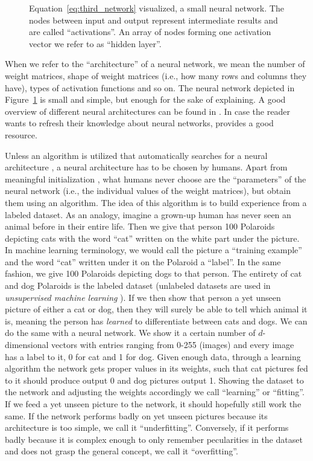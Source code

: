 \begin{figure}[!htb]
    \centering
    
    \caption{Equation~\ref{eq:third_network} visualized, a small neural network. The nodes between input and output represent intermediate results and are called \enquote{activations}. An array of nodes forming one activation vector we refer to as \enquote{hidden layer}.}
\label{fig:third_network}
\end{figure}
\FloatBarrier

\noindent When we refer to the \enquote{architecture} of a neural network, we mean the number of weight matrices, shape of weight matrices (i.e., how many rows and columns they have), types of activation functions and so on. The neural network depicted in Figure~\ref{fig:third_network} is small and simple, but enough for the sake of explaining. A good overview of different neural architectures can be found in \cite{bib:leijnen2020neural}. In case the reader wants to refresh their knowledge about neural networks, \cite{bib:goodfellow2016deep} provides a good resource.

Unless an algorithm is utilized that automatically searches for a neural architecture \cite{bib:elsken2019neural}, a neural architecture has to be chosen by humans. Apart from meaningful initialization \cite{bib:DLNN1}, what humans never choose are the \enquote{parameters} of the neural network (i.e., the individual values of the weight matrices), but obtain them using an algorithm. The idea of this algorithm is to build experience from a labeled dataset. As an analogy, imagine a grown-up human has never seen an animal before in their entire life. Then we give that person 100 Polaroids depicting cats with the word \enquote{cat} written on the white part under the picture. In machine learning terminology, we would call the picture a \enquote{training example} and the word \enquote{cat} written under it on the Polaroid a \enquote{label}. In the same fashion, we give 100 Polaroids depicting dogs to that person. The entirety of cat and dog Polaroids is the labeled dataset (unlabeled datasets are used in \textit{unsupervised machine learning} \cite{bib:ghahramani2003unsupervised}). If we then show that person a yet unseen picture of either a cat or dog, then they will surely be able to tell which animal it is, meaning the person has \textit{learned} to differentiate between cats and dogs. We can do the same with a neural network. We show it a certain number of $d$-dimensional vectors with entries ranging from 0-255 (images) and every image has a label to it, 0 for cat and 1 for dog. Given enough data, through a learning algorithm the network gets proper values in its weights, such that cat pictures fed to it should produce output 0 and dog pictures output 1. Showing the dataset to the network and adjusting the weights accordingly we call \enquote{learning} or \enquote{fitting}. If we feed a yet unseen picture to the network, it should hopefully still work the same. If the network performs badly on yet unseen pictures because its architecture is too simple, we call it \enquote{underfitting}. Conversely, if it performs badly because it is complex enough to only remember pecularities in the dataset and does not grasp the general concept, we call it \enquote{overfitting}.

